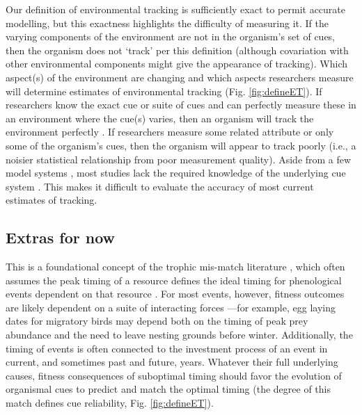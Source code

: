 \documentclass[11pt,letterpaper]{article}
\newcommand{\R}[1]{\label{}\linelabel{#1}}
\begin{document}
Our definition of environmental tracking is sufficiently exact to permit accurate modelling, but this exactness highlights the difficulty of measuring it. If the varying components of the environment are not in the organism's set of cues, then the organism does not `track' per this definition (although covariation with other environmental components might give the appearance of tracking).  Which aspect(s) of the environment are changing and which aspects researchers measure will determine estimates of environmental tracking (Fig. \ref{fig:defineET}). If researchers know the exact cue or suite of cues and can perfectly measure these in an environment where the cue(s) varies, then an organism will track the environment perfectly \R{r2arab}\citep[e.g., the photothermal model of flowering of  \emph{Arabidopsisis thaliana},][]{Wilczek:2009oa}. If researchers measure some related attribute or only some of the organism's cues, then the organism will appear to track poorly (i.e., a noisier statistical relationship from poor measurement quality).  Aside from a few model systems \citep[e.g.,][]{Wilczek:2009oa,satake2013}, most studies lack the required knowledge of the underlying cue system \citep{chmura2019}. This makes it difficult to evaluate the accuracy of most current estimates of tracking. %

\iffalse
\subsection{Extras for now}
This is a foundational concept of the trophic mis-match literature \citep{vissergienapp2019}, which often assumes the peak timing of a resource defines the ideal timing for phenological events dependent on that resource \citep[e.g. egg laying dates dependent on caterpillar abundance,][]{Visser:2005bg}. For most events, however, fitness outcomes are likely dependent on a suite of interacting forces \citep[e.g.,][]{reed2013}---for example, egg laying dates for migratory birds may depend both on the timing of peak prey abundance and the need to leave nesting grounds before winter. Additionally, the timing of events is often connected to the investment process of an event \citep[e.g., number of eggs in a clutch,][]{inouye2019} in current, and sometimes past and future, years. Whatever their full underlying causes, fitness consequences of suboptimal timing should favor the evolution of organismal cues to predict and match the optimal timing (the degree of this match defines cue reliability, Fig. \ref{fig:defineET}). 
\end{document}
